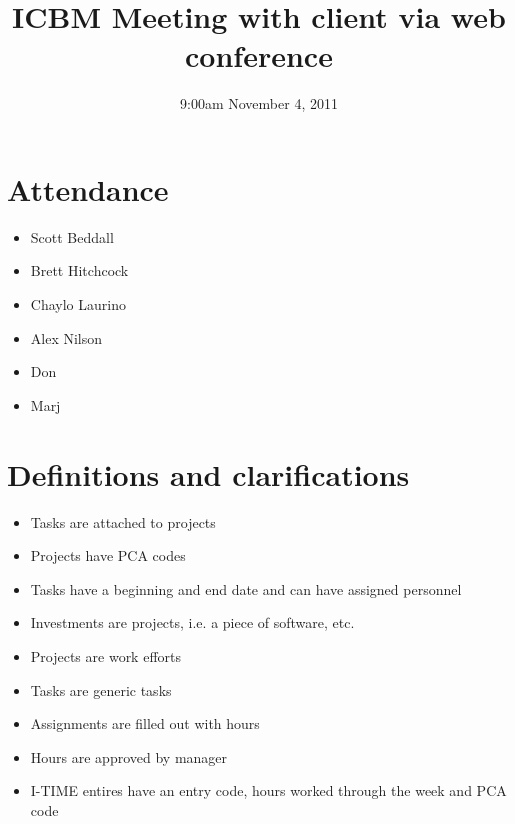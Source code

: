 \documentclass{article}
\begin{document}
\title{ICBM Meeting with  client via web conference}
\date{9:00am November 4, 2011}
\maketitle

\section{Attendance}
\begin{itemize}
\item Scott Beddall
\item Brett Hitchcock
\item Chaylo Laurino
\item Alex Nilson
\item Don
\item Marj
\end{itemize}

\section{Definitions and clarifications}
\begin{itemize}
\item Tasks are attached to projects
\item Projects have PCA codes
\item Tasks have a beginning and end date and can have assigned personnel
\item Investments are projects, i.e. a piece of software, etc.
\item Projects are work efforts
\item Tasks are generic tasks
\item Assignments are filled out with hours
\item Hours are approved by manager
\item I-TIME entires have an entry code, hours worked through the week and PCA code
\end{itemize}
\end{document}
